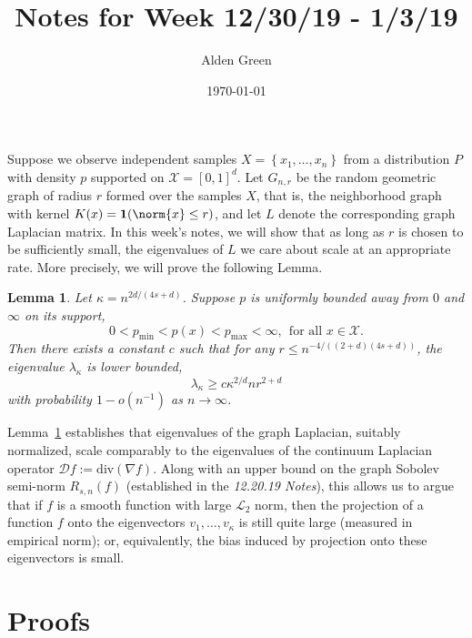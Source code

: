 \documentclass{article}
\newcommand{\set}[1]{\left\{#1\right\}}
\newcommand{\1}{\mathbf{1}}
\newcommand{\Xset}{\mathcal{X}}
\theoremstyle{alden}
\theoremstyle{aldenthm}
\newtheorem{lemma}{Lemma}
\theoremstyle{definition}
\theoremstyle{remark}
\begin{document}
\title{Notes for Week 12/30/19 - 1/3/19}
\author{Alden Green}
\date{\today}
\maketitle

Suppose we observe independent samples $X = \set{x_1,\ldots,x_n}$ from a distribution $P$ with density $p$ supported on $\mathcal{X} = [0,1]^d$. Let $G_{n,r}$ be the random geometric graph of radius $r$ formed over the samples $X$, that is, the neighborhood graph with kernel $K(x) = \1(\norm{x} \leq r)$, and let $L$ denote the corresponding graph Laplacian matrix. In this week's notes, we will show that as long as $r$ is chosen to be sufficiently small, the eigenvalues of $L$ we care about scale at an appropriate rate. More precisely, we will prove the following Lemma.
\begin{lemma}
	\label{lem:higher_order_eigenvalue_tail_bound}
	Let $\kappa = n^{2d/(4s + d)}$. Suppose $p$ is uniformly bounded away from $0$ and $\infty$ on its support,
	\begin{equation*}
	0 < p_{\min} < p(x) < p_{\max} < \infty,~~\textrm{for all $x \in \Xset$.}
	\end{equation*}
	Then there exists a constant $c$ such that for any $r \leq n^{-4/((2+d)(4s + d))}$, the eigenvalue $\lambda_{\kappa}$ is lower bounded,
	\begin{equation}
	\label{eqn:higher_order_eigenvalue_tail_bound}
	\lambda_{\kappa} \geq c\kappa^{2/d}nr^{2 + d}
	\end{equation}
	with probability $1 - o(n^{-1})$ as $n \to \infty$.
\end{lemma}
Lemma~\ref{lem:higher_order_eigenvalue_tail_bound} establishes that eigenvalues of the graph Laplacian, suitably normalized, scale comparably to the eigenvalues of the continuum Laplacian operator $\mathcal{D}f := \textrm{div}(\nabla f)$. Along with an upper bound on the graph Sobolev semi-norm $R_{s,n}(f)$ (established in the \textit{12.20.19 Notes}), this allows us to argue that if $f$ is a smooth function with large $\mathcal{L}_2$ norm, then the projection of a function $f$ onto the eigenvectors $v_1,\ldots,v_{\kappa}$ is still quite large (measured in empirical norm); or, equivalently, the bias induced by projection onto these eigenvectors is small.

\section{Proofs}
\end{document}
